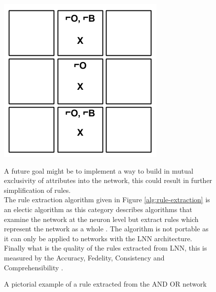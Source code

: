 \begin{figure}[H]
	\centering
	\begin{minipage}[t]{0.3\textwidth}
		\vspace{0px}
		\includegraphics[width=\textwidth]{TicTacToe-RuleExample.png}
		\caption{A pictorial example of a rule extracted from the AND OR network}
		\label{fig:tic-tac-toe-rule-example}
	\end{minipage}
	\hspace{1cm}
	\begin{minipage}[t]{0.6\textwidth}
		\vspace{0px}
		A future goal might be to implement a way to build in mutual exclusivity of attributes into the network, this could result in further simplification of rules.\\

		The rule extraction algorithm given in Figure \ref{alg:rule-extraction} is an electic algorithm as this category describes algorithms that examine the network at the neuron level but extract rules which represent the network as a whole \cite{tickle1998truth}. The algorithm is not portable as it can only be applied to networks with the LNN architecture.\\

	Finally what is the quality of the rules extracted from LNN, this is measured by the Accuracy, Fedelity, Consistency and Comprehensibility \cite{andrews1995survey}.
	\end{minipage}
	\hfill
\end{figure}

